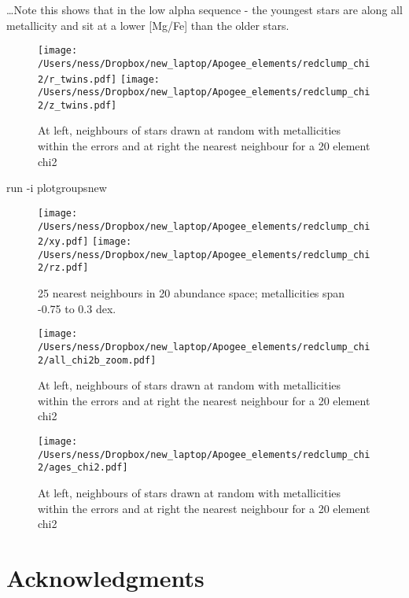 \documentclass[12pt, preprint]{aastex}
\begin{document}
\ldots Note this shows that in the low alpha sequence - the youngest stars are along all metallicity and sit at a lower [Mg/Fe] than the older stars. 


\begin{figure}
\centering
\flushleft
  \texttt{[image: /Users/ness/Dropbox/new\_laptop/Apogee\_elements/redclump\_chi2/r\_twins.pdf]}
\texttt{[image: /Users/ness/Dropbox/new\_laptop/Apogee\_elements/redclump\_chi2/z\_twins.pdf]}
    \caption{ At left, neighbours of stars drawn at random with metallicities within the errors and at right the nearest neighbour for a 20 element chi2 }
\label{fig:cn}
\end{figure}


run -i plotgroupsnew

\begin{figure}
\centering
\flushleft
  \texttt{[image: /Users/ness/Dropbox/new\_laptop/Apogee\_elements/redclump\_chi2/xy.pdf]}
   \texttt{[image: /Users/ness/Dropbox/new\_laptop/Apogee\_elements/redclump\_chi2/rz.pdf]}
    \caption{ 25 nearest neighbours in 20 abundance space; metallicities span -0.75 to 0.3 dex. }
\label{fig:cn}
\end{figure}



\begin{figure}
\centering
\flushleft
  \texttt{[image: /Users/ness/Dropbox/new\_laptop/Apogee\_elements/redclump\_chi2/all\_chi2b\_zoom.pdf]}
    \caption{ At left, neighbours of stars drawn at random with metallicities within the errors and at right the nearest neighbour for a 20 element chi2 }
\label{fig:cn}
\end{figure}


%


\begin{figure}
\centering
\flushleft
  \texttt{[image: /Users/ness/Dropbox/new\_laptop/Apogee\_elements/redclump\_chi2/ages\_chi2.pdf]}
    \caption{ At left, neighbours of stars drawn at random with metallicities within the errors and at right the nearest neighbour for a 20 element chi2 }
\label{fig:cn}
\end{figure}


\section*{Acknowledgments}
\end{document}
